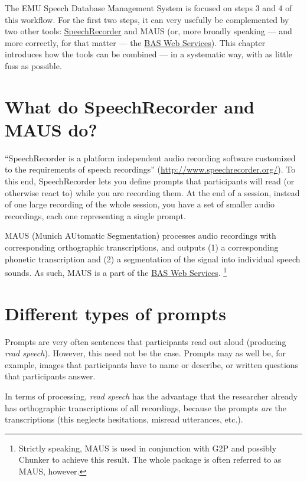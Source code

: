 \documentclass[]{book}
\let\rmarkdownfootnote\footnote%
\def\footnote{\protect\rmarkdownfootnote}
\theoremstyle{definition}
\theoremstyle{definition}
\theoremstyle{definition}
\theoremstyle{remark}
\begin{document}
The EMU Speech Database Management System is focused on steps 3 and 4 of
this workflow. For the first two steps, it can very usefully be
complemented by two other tools:
\href{http://www.speechrecorder.org/}{SpeechRecorder} and MAUS (or, more
broadly speaking --- and more correctly, for that matter --- the
\href{https://clarin.phonetik.uni-muenchen.de/BASWebServices}{BAS Web
Services}). This chapter introduces how the tools can be combined --- in
a systematic way, with as little fuss as possible.

\section{What do SpeechRecorder and MAUS
do?}\label{what-do-speechrecorder-and-maus-do}

``SpeechRecorder is a platform independent audio recording software
customized to the requirements of speech recordings''
(\url{http://www.speechrecorder.org/}). To this end, SpeechRecorder lets
you define prompts that participants will read (or otherwise react to)
while you are recording them. At the end of a session, instead of one
large recording of the whole session, you have a set of smaller audio
recordings, each one representing a single prompt.

MAUS (Munich AUtomatic Segmentation) processes audio recordings with
corresponding orthographic transcriptions, and outputs (1) a
corresponding phonetic transcription and (2) a segmentation of the
signal into individual speech sounds. As such, MAUS is a part of the
\href{https://clarin.phonetik.uni-muenchen.de/BASWebServices}{BAS Web
Services}. \footnote{Strictly speaking, MAUS is used in conjunction with
  G2P and possibly Chunker to achieve this result. The whole package is
  often referred to as MAUS, however.}

\section{Different types of prompts}\label{different-types-of-prompts}

Prompts are very often sentences that participants read out aloud
(producing \emph{read speech}). However, this need not be the case.
Prompts may as well be, for example, images that participants have to
name or describe, or written questions that participants answer.

In terms of processing, \emph{read speech} has the advantage that the
researcher already has orthographic transcriptions of all recordings,
because the prompts \emph{are} the transcriptions (this neglects
hesitations, misread utterances, etc.).
\end{document}
